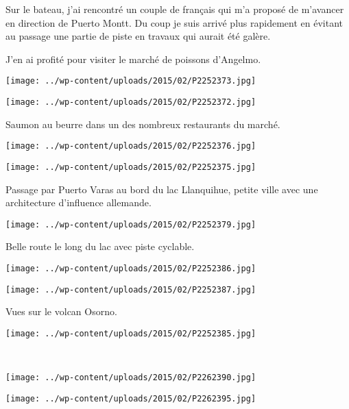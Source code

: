 \pagebreak
Sur le bateau, j'ai rencontré un couple de français qui m'a proposé de m'avancer en direction de Puerto Montt. Du coup je suis arrivé plus rapidement en évitant au passage une partie de piste en travaux qui aurait été galère.

 J'en ai profité pour visiter le marché de poissons d'Angelmo.
\begin{center} \texttt{[image: ../wp-content/uploads/2015/02/P2252373.jpg]} \end{center}
\begin{center} \texttt{[image: ../wp-content/uploads/2015/02/P2252372.jpg]} \end{center}
\vspace{-\topsep}
\vspace{-1.25mm}

\pagebreak
  Saumon au beurre dans un des nombreux restaurants du marché.
\begin{center} \texttt{[image: ../wp-content/uploads/2015/02/P2252376.jpg]} \end{center}
\begin{center} \texttt{[image: ../wp-content/uploads/2015/02/P2252375.jpg]} \end{center}
\vspace{-\topsep}
\vspace{-3.25mm}

\pagebreak
  Passage par Puerto Varas au bord du lac Llanquihue, petite ville avec une architecture d'influence allemande.
\begin{center} \texttt{[image: ../wp-content/uploads/2015/02/P2252379.jpg]} \end{center}

Belle route le long du lac avec piste cyclable.
\begin{center} \texttt{[image: ../wp-content/uploads/2015/02/P2252386.jpg]} \end{center}
\begin{center} \texttt{[image: ../wp-content/uploads/2015/02/P2252387.jpg]} \end{center}

 Vues sur le volcan Osorno.
\begin{center} \texttt{[image: ../wp-content/uploads/2015/02/P2252385.jpg]} \end{center}
\vspace{-\topsep}

\pagebreak
~
\begin{center} \texttt{[image: ../wp-content/uploads/2015/02/P2262390.jpg]} \end{center}
\begin{center} \texttt{[image: ../wp-content/uploads/2015/02/P2262395.jpg]} \end{center}
\vspace{-\topsep}
\vspace{-3.25mm}

